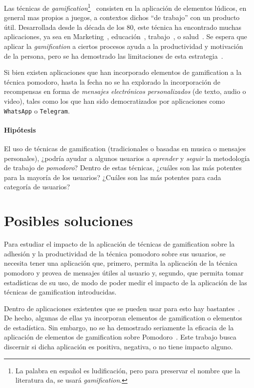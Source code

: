 \documentclass[12pt,letterpaper]{report}
\let\oldparagraph\paragraph
\renewcommand{\paragraph}[1]{\oldparagraph{#1}\mbox{}}
\begin{document}
Las técnicas de \emph{gamification}\footnote{La palabra en español es ludificación, pero para preservar el nombre que la
literatura da, se usará \emph{gamification}.}~\cite{deterding2011gamification} consisten en la aplicación de elementos
lúdicos, en general mas propios a juegos, a contextos dichos ``de trabajo'' con un producto útil.  Desarrollada desde
la década de los 80, este técnica ha encontrado muchas aplicaciones, ya sea en Marketing~\cite{hamari2010game},
educación~\cite{desousa2014systematic-gamification}, trabajo~\cite{oravec2015gamification}, o
salud~\cite{pereira2014gamification-review}. Se espera que aplicar la \emph{gamification} a ciertos procesos ayuda a la
productividad y motivación de la persona, pero se ha demostrado las limitaciones de esta
estrategia~\cite{hamari2014gamification}.

Si bien existen aplicaciones que han incorporado elementos de gamification a la técnica pomodoro, hasta la fecha no se
ha explorado la incorporación de recompensas en forma de \emph{mensajes electrónicos personalizados} (de texto, audio o
video), tales como los que han sido democratizados por aplicaciones como \texttt{WhatsApp} o \texttt{Telegram}.

\paragraph{Hipótesis} El uso de técnicas de gamification (tradicionales o basadas en musica o mensajes personales),
¿podría ayudar a algunos usuarios a \emph{aprender} y \emph{seguir} la metodología de trabajo de \emph{pomodoro}? Dentro
de estas técnicas, ¿cuáles son las más potentes para la mayoría de los usuarios? ¿Cuáles son las más potentes para cada
categoría de usuarios?

\newpage
\section{Posibles soluciones}\label{posibles-soluciones}

Para estudiar el impacto de la aplicación de técnicas de gamification sobre la adhesión y la productividad de la técnica
pomodoro sobre sus usuarios, se necesita tener una aplicación que, primero, permita la aplicación de la técnica pomodoro
y provea de mensajes útiles al usuario y, segundo, que permita tomar estadísticas de su uso, de modo de poder medir el
impacto de la aplicación de las técnicas de gamification introducidas.

Dentro de aplicaciones existentes que se pueden usar para esto hay bastantes~\cite{forest-stayfocused, focus-extension,
pomodorium, teamviz}. De hecho, algunas de ellas ya incorporan elementos de gamification o elementos de estadística. Sin
embargo, no se ha demostrado seriamente la eficacia de la aplicación de elementos de gamification sobre
Pomodoro~\cite{hamari2014gamification}. Este trabajo busca discernir si dicha aplicación es positiva, negativa, o no
tiene impacto alguno.
\end{document}
